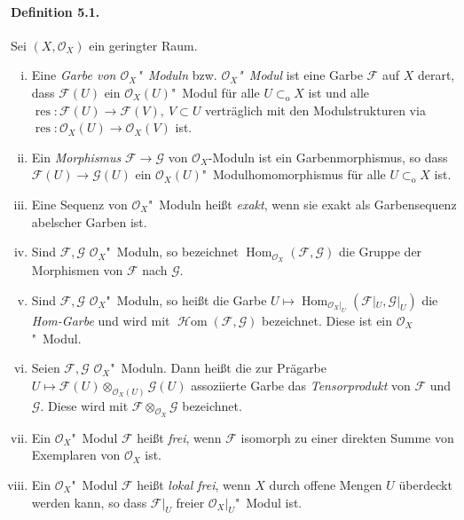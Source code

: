 \paragraph{Definition 5.1.}\label{5.1} Sei $(X,\mathcal{O}_X)$ ein geringter Raum.
\begin{enumerate}[(i)]
\item Eine \textit{Garbe von $\mathcal{O}_X$"~Moduln} bzw. \textit{$\mathcal{O}_X$"~Modul} ist eine Garbe $\mathcal{F}$ auf $X$ derart, dass $\mathcal{F}(U)$ ein $\mathcal{O}_X(U)$"~Modul für alle $U\subset_\text{o}X$ ist und alle $\operatorname{res}:\mathcal{F}(U)\to\mathcal{F}(V),\ V\subset U$ verträglich mit den Modulstrukturen via $\operatorname{res}:\mathcal{O}_X(U)\to\mathcal{O}_X(V)$ ist.
\item Ein \textit{Morphismus} $\mathcal{F}\to\mathcal{G}$ von $\mathcal{O}_X$-Moduln ist ein Garbenmorphismus, so dass $\mathcal{F}(U)\to\mathcal{G}(U)$ ein $\mathcal{O}_X(U)$"~Modulhomomorphismus für alle $U\subset_\text{o}X$ ist.
\item Eine Sequenz von $\mathcal{O}_X$"~Moduln heißt \textit{exakt}, wenn sie exakt als Garbensequenz abelscher Garben ist.
\item Sind $\mathcal{F},\mathcal{G}$ $\mathcal{O}_X$"~Moduln, so bezeichnet $\operatorname{Hom}_{\mathcal{O}_X}(\mathcal{F},\mathcal{G})$ die Gruppe der Morphismen von $\mathcal{F}$ nach $\mathcal{G}$.
\item Sind $\mathcal{F},\mathcal{G}$ $\mathcal{O}_X$"~Moduln, so heißt die Garbe $U\mapsto \operatorname{Hom}_{\mathcal{O}_X|_U}(\mathcal{F}|_U,\mathcal{G}|_U)$ die \textit{Hom-Garbe} und wird mit $\operatorname{\mathcal{H}om}(\mathcal{F},\mathcal{G})$ bezeichnet. Diese ist ein $\mathcal{O}_X$"~Modul.
\item Seien $\mathcal{F},\mathcal{G}$ $\mathcal{O}_X$"~Moduln. Dann heißt die zur Prägarbe $U\mapsto\mathcal{F}(U)\otimes_{\mathcal{O}_X(U)}\mathcal{G}(U)$ assoziierte Garbe das \textit{Tensorprodukt} von $\mathcal{F}$ und $\mathcal{G}$. Diese wird  mit $\mathcal{F}\otimes_{\mathcal{O}_X}\mathcal{G}$ bezeichnet.
\item Ein $\mathcal{O}_X$"~Modul $\mathcal{F}$ heißt \textit{frei}, wenn $\mathcal{F}$ isomorph zu einer direkten Summe von Exemplaren von $\mathcal{O}_X$ ist.
\item Ein $\mathcal{O}_X$"~Modul $\mathcal{F}$ heißt \textit{lokal frei}, wenn $X$ durch offene Mengen $U$ überdeckt werden kann, so dass $\mathcal{F}|_U$ freier $\mathcal{O}_X|_U$"~Modul ist.


\end{enumerate}
